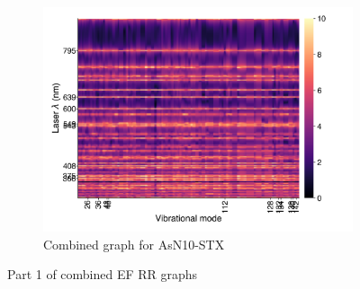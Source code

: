 \documentclass[
	fontsize=10pt, %
	twoside=true, %
	numbers=noenddot, %
]{kaobook}
\begin{document}
\begin{figure}[h]
\begin{subfigure}{8.25cm}\centering\includegraphics{comb-as12}\caption{Combined graph for AsN10-STX}\end{subfigure}
\caption[Part 1 of combined EF RR graphs]{Part 1 of combined EF RR graphs}
\end{figure}

\newpage
\end{document}
